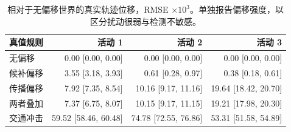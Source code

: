 \begin{table}[H]
\centering
\caption{相对于无偏移世界的真实轨迹位移，RMSE $\times10^3$。单独报告偏移强度，以区分扰动很弱与检测不敏感。}
\label{tab:stress_magnitude}
\scriptsize
\setlength{\tabcolsep}{3pt}
\begin{tabular}{lrrr}
\toprule
真值规则 & 活动 1 & 活动 2 & 活动 3 \\
\midrule
无偏移 & 0.00 [0.00, 0.00] & 0.00 [0.00, 0.00] & 0.00 [0.00, 0.00] \\
候补偏移 & 3.55 [3.18, 3.93] & 0.61 [0.28, 0.97] & 0.38 [0.18, 0.61] \\
传播偏移 & 7.92 [7.35, 8.54] & 10.16 [9.17, 11.16] & 19.64 [18.42, 20.70] \\
两者叠加 & 7.37 [6.75, 8.07] & 10.15 [9.17, 11.15] & 19.21 [17.98, 20.30] \\
交通冲击 & 59.52 [58.46, 60.48] & 74.78 [72.55, 76.86] & 53.31 [51.58, 54.89] \\
\bottomrule
\end{tabular}
\end{table}
